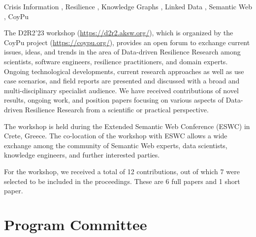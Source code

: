 \documentclass{ceurart}
\begin{document}
\begin{keywords}
  Crisis Information \sep
  Resilience \sep
  Knowledge Graphs \sep
  Linked Data \sep
  Semantic Web \sep
  CoyPu
\end{keywords}

\maketitle


The D2R2’23 workshop (\url{https://d2r2.aksw.org/}), which is organized by the CoyPu project (\url{https://coypu.org/}), provides an open forum to exchange current issues, ideas, and trends in the area of Data-driven Resilience Research among scientists, software engineers, resilience practitioners, and domain experts. Ongoing technological developments, current research approaches as well as use case scenarios, and field reports are presented and discussed with a broad and multi-disciplinary specialist audience. We have received contributions of novel results, ongoing work, and position papers focusing on various aspects of Data-driven Resilience Research from a scientific or practical perspective.

The workshop is held during the Extended Semantic Web Conference (ESWC) in Crete, Greece.
The co-location of the workshop with ESWC allows a wide exchange among the community of Semantic Web experts, data scientists, knowledge engineers, and further interested parties.

For the workshop, we received a total of 12 contributions, out of which 7 were selected to be included in the proceedings. These are 6 full papers and 1 short paper.

\section*{Program Committee}

\end{document}
